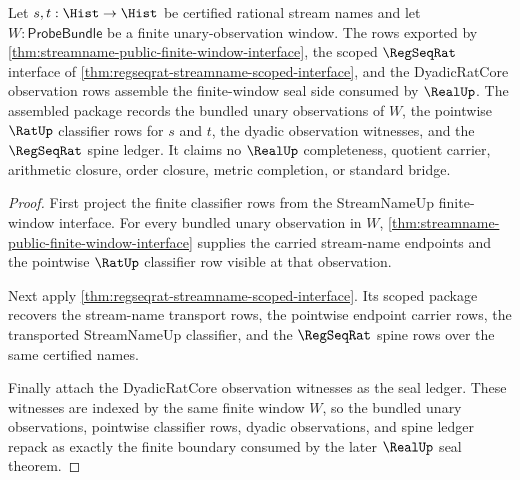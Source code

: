 \begin{theorem}
\label{thm:regseqrat-finite-window-seal-coverage}
Let $s,t:\Hist\to\Hist$ be certified rational stream names and let
$W:\mathsf{ProbeBundle}$ be a finite unary-observation window. The rows
exported by
\autoref{thm:streamname-public-finite-window-interface}, the scoped
$\RegSeqRat$ interface of
\autoref{thm:regseqrat-streamname-scoped-interface}, and the DyadicRatCore
observation rows assemble the finite-window seal side consumed by $\RealUp$.
The assembled package records the bundled unary observations of $W$, the
pointwise $\RatUp$ classifier rows for $s$ and $t$, the dyadic observation
witnesses, and the $\RegSeqRat$ spine ledger. It claims no $\RealUp$
completeness, quotient carrier, arithmetic closure, order closure, metric
completion, or standard bridge.
\end{theorem}
\begin{proof}
First project the finite classifier rows from the StreamNameUp finite-window
interface. For every bundled unary observation in $W$,
\autoref{thm:streamname-public-finite-window-interface} supplies the carried
stream-name endpoints and the pointwise $\RatUp$ classifier row visible at
that observation.

Next apply
\autoref{thm:regseqrat-streamname-scoped-interface}. Its scoped package
recovers the stream-name transport rows, the pointwise endpoint carrier rows,
the transported StreamNameUp classifier, and the $\RegSeqRat$ spine rows over
the same certified names.

Finally attach the DyadicRatCore observation witnesses as the seal ledger.
These witnesses are indexed by the same finite window $W$, so the bundled
unary observations, pointwise classifier rows, dyadic observations, and spine
ledger repack as exactly the finite boundary consumed by the later $\RealUp$
seal theorem.
\end{proof}

